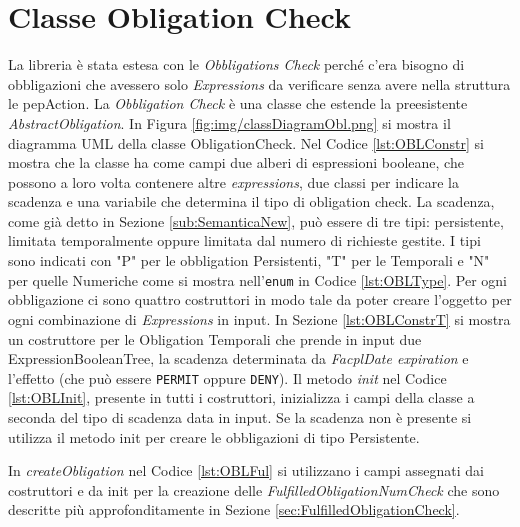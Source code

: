 \section{Classe Obligation Check}
\label{sec:Le Obligation Check}
La libreria è stata estesa con le \emph{Obbligations Check} perché c'era bisogno di obbligazioni che avessero solo
\emph{Expressions} da verificare senza avere nella struttura le pepAction.
La \emph{Obbligation Check} è una classe che estende la preesistente \emph{AbstractObligation}.
In Figura \ref{fig:img/classDiagramObl.png} si mostra il diagramma \ac{UML} della classe ObligationCheck.
Nel Codice \ref{lst:OBLConstr} si mostra che la classe ha come campi due alberi di espressioni booleane, che possono
a loro volta contenere altre \emph{expressions}, due classi per indicare la scadenza e una variabile che determina
il tipo di obligation check.
La scadenza, come già detto in Sezione \ref{sub:SemanticaNew}, può essere di tre tipi: persistente,
limitata temporalmente oppure limitata dal numero di richieste gestite. I tipi sono indicati con "P" per le obbligation Persistenti,
"T" per le Temporali e "N" per quelle Numeriche come si mostra nell'\texttt{enum} in Codice \ref{lst:OBLType}.
Per ogni obbligazione ci sono quattro costruttori in modo tale da poter creare l'oggetto per ogni combinazione di \emph{Expressions}
in input. In Sezione \ref{lst:OBLConstrT} si mostra un costruttore per le Obligation Temporali che prende in input due ExpressionBooleanTree,
la scadenza determinata da \emph{FacplDate expiration} e l'effetto (che può essere \texttt{PERMIT} oppure \texttt{DENY}).
Il metodo \emph{init} nel Codice \ref{lst:OBLInit}, presente in tutti i costruttori, inizializza i campi della classe a seconda del tipo di scadenza data
in input. Se la scadenza non è presente si utilizza il metodo init per creare le obbligazioni di tipo Persistente.

In \emph{createObligation} nel Codice \ref{lst:OBLFul} si utilizzano i campi assegnati dai costruttori
e da init per la creazione delle \emph{FulfilledObligationNumCheck}
che sono descritte più approfonditamente in Sezione \ref{sec:FulfilledObligationCheck}.

